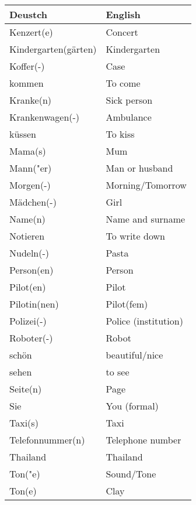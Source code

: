 \documentclass{article}
\renewcommand{\arraystretch}{1}
\begin{document}
\hfill
\begin{minipage}{0.48\textwidth}
    \centering
    \renewcommand{\arraystretch}{1.5}
    \begin{tabular}{|>{\raggedright\arraybackslash}p{3.5cm}|>{\raggedright\arraybackslash}p{3.5cm}|}
        \hline
        \rowcolor{gray!20} \textbf{Deustch} & \textbf{English} \\
        \hline
        Kenzert(e) & Concert \\\hline
        Kindergarten(gärten) & Kindergarten \\\hline
        Koffer(-) & Case \\\hline
        kommen & To come \\\hline
        Kranke(n) & Sick person \\\hline
        Krankenwagen(-) & Ambulance \\\hline
        küssen & To kiss \\\hline
        Mama(s) & Mum \\\hline
        Mann("er) & Man or husband \\\hline
        Morgen(-) & Morning/Tomorrow \\\hline
        Mädchen(-) & Girl \\\hline
        Name(n) & Name and surname \\\hline
        Notieren & To write down \\\hline
        Nudeln(-) & Pasta \\\hline
        Person(en) & Person \\\hline
        Pilot(en) & Pilot \\\hline
        Pilotin(nen) & Pilot(fem) \\\hline
        Polizei(-) & Police (institution) \\\hline
        Roboter(-) & Robot \\\hline
        schön & beautiful/nice \\\hline
        sehen & to see \\\hline
        Seite(n) & Page \\\hline
        Sie & You (formal) \\\hline
        Taxi(s) & Taxi \\\hline
        Telefonnummer(n) & Telephone number \\\hline
        Thailand & Thailand \\\hline
        Ton("e) & Sound/Tone \\\hline
        Ton(e) & Clay \\\hline
    \end{tabular}
\end{minipage}
\end{document}
